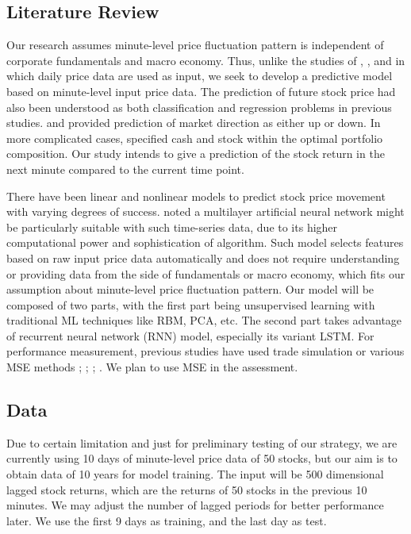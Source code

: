 \documentclass{article}
\begin{document}
\subsection{Literature Review}

Our research assumes minute-level price fluctuation pattern is independent of corporate fundamentals and macro economy. Thus, unlike the studies of \cite{Chiang2016}, \cite{Chourmouziadis2016}, and \cite{Zhong2017} in which daily price data are used as input, we seek to develop a predictive model based on minute-level input price data. The prediction of future stock price had also been understood as both classification and regression problems in previous studies. \cite{Chen2016} and \cite{Zhong2017} provided prediction of market direction as either up or down. In more complicated cases, \cite{Chourmouziadis2016} specified cash and stock within the optimal portfolio composition. Our study intends to give a prediction of the stock return in the next minute compared to the current time point.

There have been linear and nonlinear models to predict stock price movement with varying degrees of success. \cite{Chong2017} noted a multilayer artificial neural network might be particularly suitable with such time-series data, due to its higher computational power and sophistication of algorithm. Such model selects features based on raw input price data automatically and does not require understanding or providing data from the side of fundamentals or macro economy, which fits our assumption about minute-level price fluctuation pattern. Our model will be composed of two parts, with the first part being unsupervised learning with traditional ML techniques like RBM, PCA, etc. The second part takes advantage of recurrent neural network (RNN) model, especially its variant LSTM. For performance measurement, previous studies have used trade simulation or various MSE methods \cite{Chiang2016}; \cite{Chourmouziadis2016}; \cite{Zhong2017}; \cite{Chong2017}. We plan to use MSE in the assessment. 

\subsection{Data}

Due to certain limitation and just for preliminary testing of our strategy, we are currently using 10 days of minute-level price data of 50 stocks, but our aim is to obtain data of 10 years for model training. The input will be 500 dimensional lagged stock returns, which are the returns of 50 stocks in the previous 10 minutes. We may adjust the number of lagged periods for better performance later. We use the first 9 days as training, and the last day as test.
\end{document}
